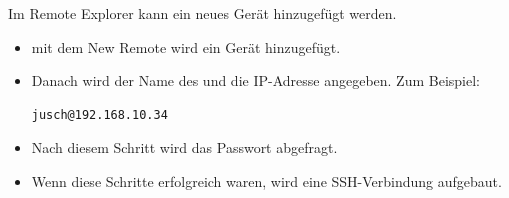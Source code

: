 \newpage
Im Remote Explorer kann ein neues Gerät hinzugefügt werden. 
\begin{itemize}
  \item mit dem New Remote wird ein Gerät hinzugefügt.
  \item Danach wird der Name des \raspi und die IP-Adresse angegeben. Zum Beispiel:
  \begin{verbatim}
jusch@192.168.10.34
\end{verbatim}
  \item Nach diesem Schritt wird das Passwort abgefragt. 
  \item Wenn diese Schritte erfolgreich waren, wird eine SSH-Verbindung aufgebaut.
\end{itemize}
